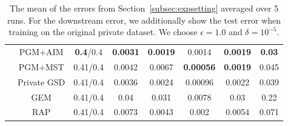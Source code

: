 \begin{table}[ht]
\begin{tabular}{cccccccc}
 & PGM+AIM&\textbf{0.4}/0.4 & \textbf{0.0031} & \textbf{0.0019} & 0.0014 & \textbf{0.0019} & \textbf{0.03} \\
 & PGM+MST&0.41/0.4 & 0.0042 & 0.0067 & \textbf{0.00056} & \textbf{0.0019} & 0.045 \\
 & Private GSD&0.41/0.4 & 0.0036 & 0.0024 & 0.00096 & 0.0022 & 0.039 \\
 & GEM&0.41/0.4 & 0.04 & 0.031 & 0.0078 & 0.03 & 0.22 \\
 & RAP&0.41/0.4 & 0.0073 & 0.0043 & 0.002 & 0.0054 & 0.071 \\
\bottomrule
\end{tabular}
\caption{
    \small The mean of the errors from Section~\ref{subsec:expsetting}  averaged over 5 runs. For the downstream error, we additionally show the test error when training on the original private dataset. We choose $\epsilon =1.0$ and $\delta = 10^{-5}$.}
    \end{table}


